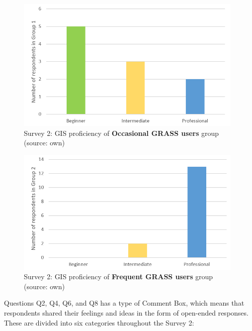 \documentclass[a4paper,10pt,twoside]{article}
\begin{document}
\vspace{0.3cm}
\begin{figure}[hbt!] 
\begin{center}
\includegraphics[width=11cm]{../surveys/analyzed_data/survey2_respondents_group1.png} 
\caption[Survey 2: GIS proficiency of \textbf{Occasional GRASS users} group]{Survey 2: GIS proficiency of \textbf{Occasional GRASS users} group (source: own)}
\label{fig:survey2_respondents_group1}
\end{center}
\end{figure}

\begin{figure}[hbt!] 
\begin{center}
\includegraphics[width=11cm]{../surveys/analyzed_data/survey2_respondents_group2.png} 
\caption[Survey 2: GIS proficiency of \textbf{Frequent GRASS users} group]{Survey 2: GIS proficiency of \textbf{Frequent GRASS users} group (source: own)}
\label{fig:survey2_respondents_group2}
\end{center}
\end{figure}


\noindent Questions Q2, Q4, Q6, and Q8 has a type of Comment Box, which means that respondents shared their feelings and ideas in the form of open-ended responses. These are divided into six categories throughout the Survey 2:
\end{document}
